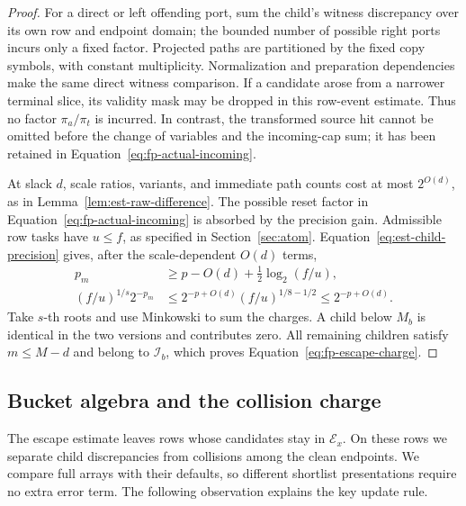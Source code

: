 \begin{proof}
For a direct or left offending port, sum the child's witness discrepancy
over its own row and endpoint domain; the bounded number of possible
right ports incurs only a fixed factor.  Projected paths are partitioned
by the fixed copy symbols, with constant multiplicity.  Normalization
and preparation dependencies make the same direct witness comparison.
If a candidate arose from a narrower terminal slice, its validity mask
may be dropped in this row-event estimate.  Thus no factor
$\pi_a/\pi_t$ is incurred.  In contrast, the transformed source hit
cannot be omitted before the change of variables and the incoming-cap
sum; it has been retained in Equation~\eqref{eq:fp-actual-incoming}.

At slack $d$, scale ratios, variants, and immediate path counts cost at
most $2^{O(d)}$, as in Lemma~\ref{lem:est-raw-difference}.  The possible
reset factor in Equation~\eqref{eq:fp-actual-incoming} is absorbed by the
precision gain.  Admissible row tasks have $u\le f$, as specified in
Section~\ref{sec:atom}.  Equation~\eqref{eq:est-child-precision} gives,
after the scale-dependent $O(d)$ terms,
\begin{align*}
 p_m&\ge p-O(d)+\tfrac12\log_2(f/u),\\
 (f/u)^{1/s}2^{-p_m}
 &\le 2^{-p+O(d)}(f/u)^{1/8-1/2}
 \le 2^{-p+O(d)}.
\end{align*}
Take $s$-th roots and use Minkowski to sum the charges.  A child below
$M_b$ is identical in the two versions and contributes zero.  All
remaining children satisfy $m\le M-d$ and belong to $\mathcal I_b$,
which proves Equation~\eqref{eq:fp-escape-charge}.
\end{proof}

\subsection{Bucket algebra and the collision charge}

The escape estimate leaves rows whose candidates stay in
$\mathcal E_x$.  On these rows we separate child discrepancies from
collisions among the clean endpoints.  We compare full arrays with
their defaults, so different shortlist presentations require no extra
error term.  The following observation explains the key update rule.

